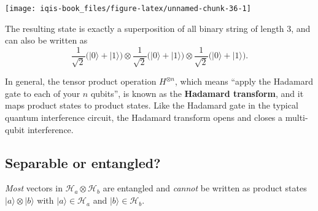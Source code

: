 \documentclass[fleqn]{article}
\newenvironment{idea}{\noindent}{\medskip}
\begin{document}
\begin{center}\texttt{[image: iqis-book\_files/figure-latex/unnamed-chunk-36-1]} \end{center}

The resulting state is exactly a superposition of all binary string of length 3, and can also be written as
\[
  \frac{1}{\sqrt2} \big(|0\rangle + |1\rangle\big)
  \otimes
  \frac{1}{\sqrt2} \big(|0\rangle + |1\rangle\big)
  \otimes
  \frac{1}{\sqrt2} \big(|0\rangle + |1\rangle\big).
\]

In general, the tensor product operation \(H^{\otimes n}\), which means ``apply the Hadamard gate to each of your \(n\) qubits'', is known as the \textbf{Hadamard transform}, and it maps product states to product states.
Like the Hadamard gate in the typical quantum interference circuit, the Hadamard transform opens and closes a multi-qubit interference.

\hypertarget{separable-or-entangled}{%
\subsection{Separable or entangled?}\label{separable-or-entangled}}

\begin{idea}
\emph{Most} vectors in \(\mathcal{H}_a\otimes \mathcal{H}_b\) are entangled and \emph{cannot} be written as product states \(|a\rangle\otimes|b\rangle\) with \(|a\rangle\in\mathcal{H}_a\) and \(|b\rangle\in\mathcal{H}_b\).

\end{idea}
\end{document}
